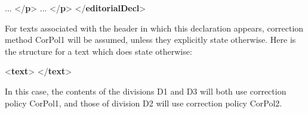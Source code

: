 \begin{shaded}
\mbox{}\newline 
{}\mbox{}\newline 
\hspace*{1em} ... {</\textbf{p}>}\mbox{}\newline 
\hspace*{1em} ... {</\textbf{p}>}\mbox{}\newline 
{}\mbox{}\newline 
{</\textbf{editorialDecl}>}\end{shaded}\egroup\par \noindent  For texts associated with the header in which this declaration appears, correction method CorPol1 will be assumed, unless they explicitly state otherwise. Here is the structure for a text which does state otherwise: \par\bgroup{}\exampleFont \begin{shaded}\noindent\mbox{}{<\textbf{text}>}\mbox{}\newline 
{}\mbox{}\newline 
\hspace*{1em}\mbox{}\newline 
\hspace*{1em}\mbox{}\newline 
\hspace*{1em}\mbox{}\newline 
{}\mbox{}\newline 
{</\textbf{text}>}\end{shaded}\egroup\par \noindent  In this case, the contents of the divisions D1 and D3 will both use correction policy CorPol1, and those of division D2 will use correction policy CorPol2.\par
